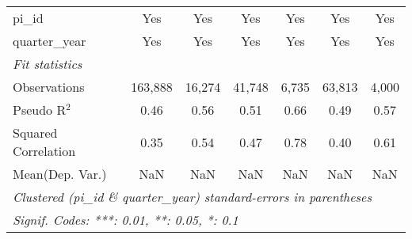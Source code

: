 \begin{tabular}{lcccccc}
   pi\_id                                                     & Yes           & Yes           & Yes           & Yes           & Yes           & Yes\\  
   quarter\_year                                              & Yes           & Yes           & Yes           & Yes           & Yes           & Yes\\  
   \midrule
   \emph{Fit statistics}\\
   Observations                                               & 163,888       & 16,274        & 41,748        & 6,735         & 63,813        & 4,000\\  
   Pseudo R$^2$                                               & 0.46          & 0.56          & 0.51          & 0.66          & 0.49          & 0.57\\  
   Squared Correlation                                        & 0.35          & 0.54          & 0.47          & 0.78          & 0.40          & 0.61\\  
Mean(Dep. Var.) & NaN & NaN & NaN & NaN & NaN & NaN \\
   \midrule \midrule
   \multicolumn{7}{l}{\emph{Clustered (pi\_id \& quarter\_year) standard-errors in parentheses}}\\
   \multicolumn{7}{l}{\emph{Signif. Codes: ***: 0.01, **: 0.05, *: 0.1}}\\
\end{tabular}
\par\endgroup
